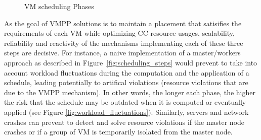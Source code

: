 \begin{figure}[ht]
\vspace*{-.2cm}
\begin{center}
        \subcapcentertrue
\vspace*{-.2cm}
\caption{VM scheduling Phases}
\end{center}
\label{fig:scheduling}
\vspace*{-.2cm}
\end{figure}
%

As the goal  of VMPP solutions is to maintain a placement that
satisifies the requirements of each VM while optimizing CC resource usages, scalability,
reliability and reactivity of the mechanisms implementing each of
these three steps are decisive. For instance, a naive implementation
of a master/workers approach as described in
Figure~\ref{fig:scheduling_steps} would prevent to take into account
workload fluctuations during the computation and the application of a
schedule, leading potentially to artifical violations (\ie resource violations
that are due to the VMPP mechanism). In other words, the longer each
phase,
the higher the risk that the schedule may be outdated when it is
computed or eventually applied (see Figure
\ref{fig:workload_fluctuations}). Similarly, servers and network
crashes can prevent to detect and solve resource violations if the
master node crashes or if a group of VM is temporarily isolated from
the master node.

